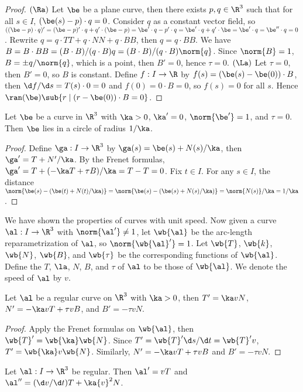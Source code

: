 \documentclass[10pt]{article}
\begin{document}
\begin{proof}
    $(\Ra)$ Let $\be$ be a plane curve, then there exists $p,q\in{\R}^{3}$ such that for all $s\in I$, $(\be(s)-p)\cdot q=0$. Consider $q$ as a constant vector field, so $((\be-p)\cdot q)'=(\be-p)'\cdot q+q'\cdot(\be-p)=\be'\cdot q-p'\cdot q=\be'\cdot q+q'\cdot\be=\be'\cdot q=\be''\cdot q=0$. Rewrite $q=q\cdot TT+q\cdot NN+q\cdot BB$, then $q=q\cdot BB$. We have $B=B\cdot BB=(B\cdot B)/(q\cdot B)q=(B\cdot B)/(q\cdot B)\norm{q}$. Since $\norm{B}=1$, $B=\pm q/\norm{q}$, which is a point, then $B'=0$, hence $\tau=0$. $(\La)$ Let $\tau=0$, then $B'=0$, so $B$ is constant. Define $f:I\to\R$ by $f(s)=(\be(s)-\be(0))\cdot B$, then $\d f/\d s=T(s)\cdot 0=0$ and $f(0)=0\cdot B=0$, so $f(s)=0$ for all $s$. Hence $\ran(\be)\sub\{r\mid(r-\be(0))\cdot B=0\}$.
\end{proof}
\begin{proposition}
    Let $\be$ be a curve in ${\R}^{3}$ with $\ka>0$, $\ka'=0$, $\norm{\be'}=1$, and $\tau=0$. Then $\be$ lies in a circle of radius $1/\ka$.
\end{proposition}
\begin{proof}
    Define $\ga:I\to{\R}^{3}$ by $\ga(s)=\be(s)+N(s)/\ka$, then $\ga'=T+N'/\ka$. By the Frenet formulas, $\ga'=T+(-\ka T+\tau B)/\ka=T-T=0$. Fix $t\in I$. For any $s\in I$, the distance $\norm{\be(s)-(\be(t)+N(t)/\ka)}=\norm{\be(s)-(\be(s)+N(s)/\ka)}=\norm{N(s)}/\ka=1/\ka$.
\end{proof}
\par
We have shown the properties of curves with unit speed. Now given a curve $\al:I\to{\R}^{3}$ with $\norm{\al'}\ne 1$, let $\wb{\al}$ be the arc-length reparametrization of $\al$, so $\norm{\wb{\al}'}=1$. Let $\wb{T}$, $\wb{k}$, $\wb{N}$, $\wb{B}$, and $\wb{\tau}$ be the corresponding functions of $\wb{\al}$. Define the $T$, $\la$, $N$, $B$, and $\tau$ of $\al$ to be those of $\wb{\al}$. We denote the speed of $\al$ by $v$.
\begin{theorem}
    Let $\al$ be a regular curve on ${\R}^{3}$ with $\ka>0$, then $T'=\ka vN$, $N'=-\ka vT+\tau vB$, and $B'=-\tau vN$.
\end{theorem}
\begin{proof}
    Apply the Frenet formulas on $\wb{\al}$, then $\wb{T}'=\wb{\ka}\wb{N}$. Since $T'=\wb{T}'\d s/\d t=\wb{T}'v$, $T'=\wb{\ka}v\wb{N}$. Similarly, $N'=-\ka vT+\tau vB$ and $B'=-\tau vN$.
\end{proof}
\begin{proposition}
    Let $\al:I\to{\R}^{3}$ be regular. Then $\al'=vT$ and $\al''=(\d v/\d t)T+\ka{v}^{2}N$.
\end{proposition}
\end{document}
